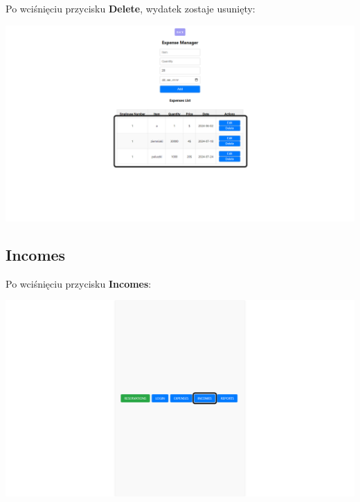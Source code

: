 \documentclass[12pt]{article}
\begin{document}
\begin{minipage}{\textwidth}
\noindent Po wciśnięciu przycisku \textbf{Delete}, wydatek zostaje usunięty:
\begin{center}
\includegraphics[width=\textwidth]{media/Expenses_deleteSuccessfull.png}
\end{center}
\end{minipage}

\newpage
\subsection{Incomes}
\begin{minipage}{\textwidth}
\noindent Po wciśnięciu przycisku \textbf{Incomes}:
\begin{center}
\includegraphics[width=\textwidth]{media/Incomes.png}
\end{center}
\end{minipage}
\end{document}
